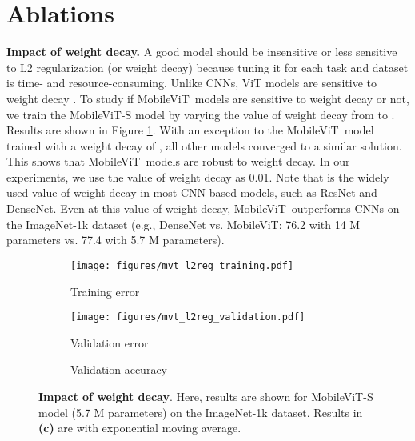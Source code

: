 \documentclass[preprint]{article} \usepackage{iclr2022_conference,times}
\newcommand{\arch}{MobileViT}
\begin{document}
\section{Ablations}
\label{sec:appendix_ablations}

\textbf{Impact of weight decay.} A good model should be insensitive or less sensitive to L2 regularization (or weight decay) because tuning it for each task and dataset is time- and resource-consuming. Unlike CNNs, ViT models are sensitive to weight decay \citep{dosovitskiy2020image, touvron2021training, xiao2021early}. To study if \arch~models are sensitive to weight decay or not, we train the \arch-S model by varying the value of weight decay from  to .  Results are shown in Figure \ref{fig:wt_decay}. With an exception to the \arch~model trained with a weight decay of , all other models converged to a similar solution. This shows that \arch~models are robust to weight decay. In our experiments, we use the value of weight decay as 0.01. Note that  is the widely used value of weight decay in most CNN-based models, such as ResNet and DenseNet. Even at this value of weight decay, \arch~outperforms CNNs on the ImageNet-1k dataset (e.g., DenseNet vs. \arch: 76.2 with 14 M parameters vs. 77.4 with 5.7 M parameters).

\begin{figure}[t!]
    \centering
    \begin{subfigure}[b]{0.32\columnwidth} 
        \centering
        \texttt{[image: figures/mvt\_l2reg\_training.pdf]}
        \caption{Training error}
    \end{subfigure}
    \hfill
    \begin{subfigure}[b]{0.32\columnwidth}
        \centering
        \texttt{[image: figures/mvt\_l2reg\_validation.pdf]}
        \caption{Validation error}
    \end{subfigure}
    \hfill
    \begin{subfigure}[b]{0.32\columnwidth}
        \centering
        \caption{Validation accuracy}
    \end{subfigure}
    \caption{\textbf{Impact of weight decay}. Here, results are shown for \arch-S model (5.7 M parameters) on the ImageNet-1k dataset. Results in \textbf{(c)} are with exponential moving average.}
    \label{fig:wt_decay}
\end{figure}
\end{document}
